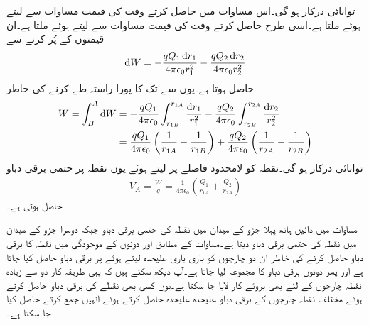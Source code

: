 توانائی درکار ہو گی۔اس مساوات میں  حاصل کرتے وقت  کی قیمت مساوات  سے لیتے ہوئے  ملتا ہے۔اسی طرح  حاصل کرتے وقت  کی قیمت مساوات  سے لیتے ہوئے  ملتا ہے۔ان قیمتوں کے پُر کرنے سے
\begin{align*}
\dif W=- \frac{q Q_1 \dif r_1}{4\pi \epsilon_0 r_1^2} - \frac{q Q_2 \dif r_2}{4\pi \epsilon_0 r_2^2} 
\end{align*}
حاصل ہوتا ہے۔یوں  سے  تک کا پورا راستہ طے کرنے کی خاطر
\begin{align*}
W=\int_B^A \dif W&=- \frac{q Q_1 }{4\pi \epsilon_0} \int_{r_{1B}}^{r_{1A}} \frac{\dif r_1}{r_1^2} -\frac{q Q_2 }{4\pi \epsilon_0} \int_{r_{2B}}^{r_{2A}} \frac{\dif r_2}{r_2^2}\\
&=\frac{q Q_1 }{4\pi \epsilon_0} \left(\frac{1}{r_{1A}}-\frac{1}{r_{1B}} \right)+\frac{q Q_2 }{4\pi \epsilon_0} \left(\frac{1}{r_{2A}}-\frac{1}{r_{2B}} \right)
\end{align*}
توانائی درکار ہو گی۔نقطہ  کو لامحدود فاصلے پر لیتے ہوئے یوں نقطہ  پر حتمی برقی دباو
\begin{align}\label{مساوات_توانائی_نقطہ_چارج_کی_حتمی_دباو_پ}
V_A=\frac{W}{q}=\frac{1}{4\pi \epsilon_0} \left(\frac{Q_1}{r_{1A}}+\frac{Q_2}{r_{2A}} \right)
\end{align}
حاصل ہوتی ہے۔

مساوات  میں دائیں ہاتھ پہلا جزو  کے میدان میں نقطہ  کی حتمی برقی دباو جبکہ
 دوسرا جزو  کے میدان میں نقطہ  کی حتمی برقی دباو دیتا ہے۔مساوات    کے مطابق  اور  دونوں کے موجودگی میں نقطہ  کا برقی دباو حاصل کرنے کی خاطر ان دو چارجوں کو باری باری علیحدہ لیتے ہوئے  پر برقی دباو حاصل کیا جاتا ہے اور پھر دونوں برقی دباو کا مجموعہ لیا جاتا ہے۔آپ دیکھ سکتے ہیں کہ یہی طریقہ کار دو سے زیادہ نقطہ چارجوں کے لئے بھی بروئے کار لایا جا سکتا ہے۔یوں کسی بھی نقطے کی برقی دباو حاصل کرتے ہوئے مختلف نقطہ چارجوں کے برقی دباو علیحدہ علیحدہ حاصل کرتے ہوئے انہیں جمع کرتے حاصل کیا جا سکتا ہے۔

